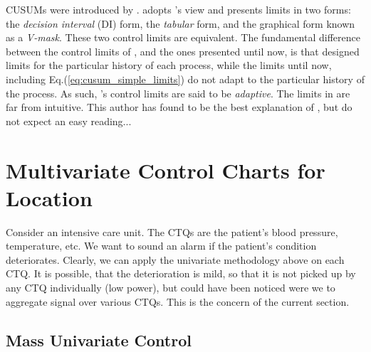 \begin{extra}
CUSUMs were introduced by \cite{page_continuous_1954}. 
\cite{montgomery_introduction_2007} adopts \citeauthor{page_continuous_1954}'s view and presents limits in two forms: the \emph{decision interval} (DI) form, \aka the \emph{tabular} form, and the graphical form known as a \emph{V-mask}.
These two control limits are equivalent. 
The fundamental difference between the control limits of \cite{page_continuous_1954}, and the ones presented until now, is that \citeauthor{page_continuous_1954} designed limits for the particular history of each process, while the limits until now, including Eq.(\ref{eq:cusum_simple_limits}) do not adapt to the particular history of the process.
As such, \citeauthor{page_continuous_1954}'s control limits are said to be \emph{adaptive}.
The limits in \cite{page_continuous_1954} are far from intuitive. 
This author has found \cite{ritov_decision_1990} to be the best explanation of \cite{page_continuous_1954}, but do not expect an easy reading...
\end{extra}









\section[Multivariate]{Multivariate Control Charts for Location}
\label{sec:multivariate}

\begin{example}
\label{eg:intensive}
Consider an intensive care unit. 
The CTQs are the patient's blood pressure, temperature, etc.
We want to sound an alarm if the patient's condition deteriorates. 
Clearly, we can apply the univariate methodology above on each CTQ.
It is possible, that the deterioration is mild, so that it is not picked up by any CTQ individually (low power), but could have been noticed were we to aggregate signal over various CTQs. 
This is the concern of the current section. 
\end{example}


\subsection{Mass Univariate Control}
\label{sec:mass_univariate}

